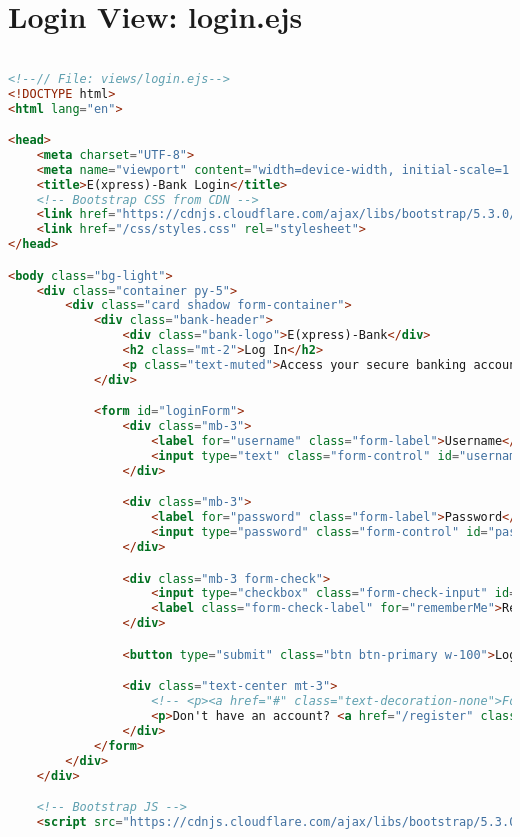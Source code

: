 \section{Login View: login.ejs}
\begin{lstlisting}[language=HTML]

<!--// File: views/login.ejs-->
<!DOCTYPE html>
<html lang="en">

<head>
    <meta charset="UTF-8">
    <meta name="viewport" content="width=device-width, initial-scale=1.0">
    <title>E(xpress)-Bank Login</title>
    <!-- Bootstrap CSS from CDN -->
    <link href="https://cdnjs.cloudflare.com/ajax/libs/bootstrap/5.3.0/css/bootstrap.min.css" rel="stylesheet">
    <link href="/css/styles.css" rel="stylesheet">
</head>

<body class="bg-light">
    <div class="container py-5">
        <div class="card shadow form-container">
            <div class="bank-header">
                <div class="bank-logo">E(xpress)-Bank</div>
                <h2 class="mt-2">Log In</h2>
                <p class="text-muted">Access your secure banking account</p>
            </div>

            <form id="loginForm">
                <div class="mb-3">
                    <label for="username" class="form-label">Username</label>
                    <input type="text" class="form-control" id="username" required>
                </div>

                <div class="mb-3">
                    <label for="password" class="form-label">Password</label>
                    <input type="password" class="form-control" id="password" required>
                </div>

                <div class="mb-3 form-check">
                    <input type="checkbox" class="form-check-input" id="rememberMe">
                    <label class="form-check-label" for="rememberMe">Remember me</label>
                </div>

                <button type="submit" class="btn btn-primary w-100">Log In</button>

                <div class="text-center mt-3">
                    <!-- <p><a href="#" class="text-decoration-none">Forgot password?</a></p> -->
                    <p>Don't have an account? <a href="/register" class="text-decoration-none">Sign up</a></p>
                </div>
            </form>
        </div>
    </div>

    <!-- Bootstrap JS -->
    <script src="https://cdnjs.cloudflare.com/ajax/libs/bootstrap/5.3.0/js/bootstrap.bundle.min.js"></script>


\end{lstlisting}
